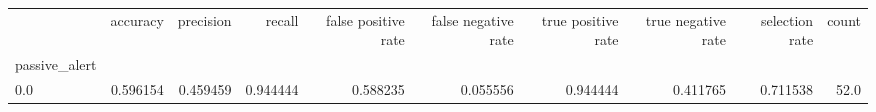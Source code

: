 \begin{tabular}{lrrrrrrrrr}
\toprule
{} &  accuracy &  precision &    recall &  false positive rate &  false negative rate &  true positive rate &  true negative rate &  selection rate &  count \\
passive\_alert &           &            &           &                      &                      &                     &                     &                 &        \\
\midrule
0.0           &  0.596154 &   0.459459 &  0.944444 &             0.588235 &             0.055556 &            0.944444 &            0.411765 &        0.711538 &   52.0 \\
\bottomrule
\end{tabular}
